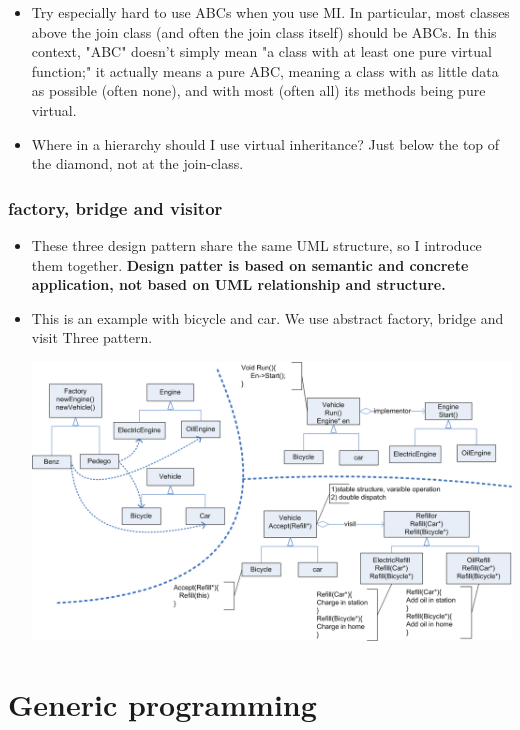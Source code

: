 \documentclass[a4paper,11pt,twoside]{book}
\begin{document}
\begin{itemize}
	\item Try especially hard to use ABCs when you use MI. In particular, most classes above the join class (and often the join class itself) should be ABCs. In this context, "ABC" doesn't simply mean "a class with at least one pure virtual function;" it actually means a pure ABC, meaning a class with as little data as possible (often none), and with most (often all) its methods being pure virtual.
	
	\item Where in a hierarchy should I use virtual inheritance?  Just below the top of the diamond, not at the join-class.
	
\end{itemize}

\subsection{factory, bridge and visitor}

\begin{itemize}
	\item These three design pattern share the same UML structure, so I introduce them together. \textbf{Design patter is based on semantic and concrete application, not based on UML relationship and structure.}
	
	\item This is an example with bicycle and car.  We use abstract factory, bridge and visit Three pattern. 

		\centering
		\includegraphics[width=0.9\linewidth]{pics/visitor.png}
	    
\end{itemize}
     
\chapter{Generic programming}
     
\end{document}
